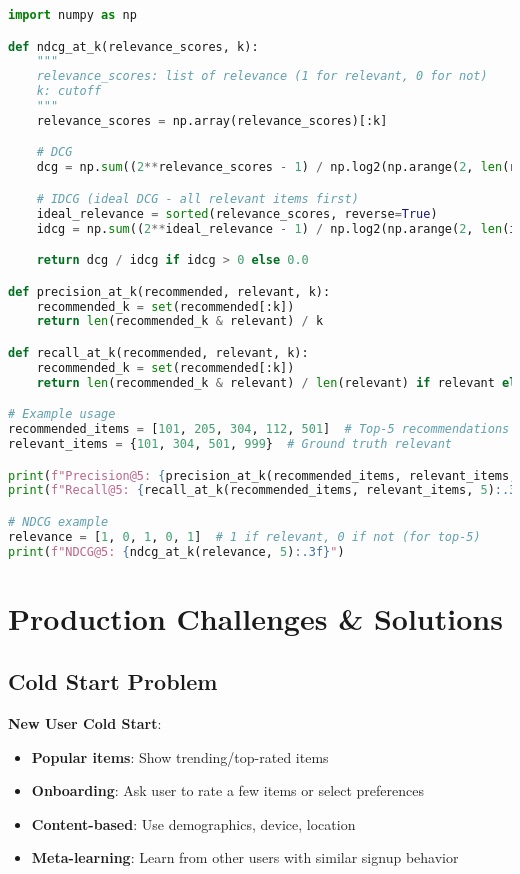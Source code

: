 \documentclass[10pt]{article}
\begin{document}
\begin{lstlisting}[language=Python]
import numpy as np

def ndcg_at_k(relevance_scores, k):
    """
    relevance_scores: list of relevance (1 for relevant, 0 for not)
    k: cutoff
    """
    relevance_scores = np.array(relevance_scores)[:k]

    # DCG
    dcg = np.sum((2**relevance_scores - 1) / np.log2(np.arange(2, len(relevance_scores) + 2)))

    # IDCG (ideal DCG - all relevant items first)
    ideal_relevance = sorted(relevance_scores, reverse=True)
    idcg = np.sum((2**ideal_relevance - 1) / np.log2(np.arange(2, len(ideal_relevance) + 2)))

    return dcg / idcg if idcg > 0 else 0.0

def precision_at_k(recommended, relevant, k):
    recommended_k = set(recommended[:k])
    return len(recommended_k & relevant) / k

def recall_at_k(recommended, relevant, k):
    recommended_k = set(recommended[:k])
    return len(recommended_k & relevant) / len(relevant) if relevant else 0.0

# Example usage
recommended_items = [101, 205, 304, 112, 501]  # Top-5 recommendations
relevant_items = {101, 304, 501, 999}  # Ground truth relevant

print(f"Precision@5: {precision_at_k(recommended_items, relevant_items, 5):.3f}")
print(f"Recall@5: {recall_at_k(recommended_items, relevant_items, 5):.3f}")

# NDCG example
relevance = [1, 0, 1, 0, 1]  # 1 if relevant, 0 if not (for top-5)
print(f"NDCG@5: {ndcg_at_k(relevance, 5):.3f}")
\end{lstlisting}

\section{Production Challenges \& Solutions}

\subsection{Cold Start Problem}

\textbf{New User Cold Start}:
\begin{itemize}[leftmargin=*]
    \item \textbf{Popular items}: Show trending/top-rated items
    \item \textbf{Onboarding}: Ask user to rate a few items or select preferences
    \item \textbf{Content-based}: Use demographics, device, location
    \item \textbf{Meta-learning}: Learn from other users with similar signup behavior
\end{itemize}
\end{document}
